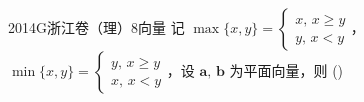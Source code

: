 
\begin{problem}{2014}{G}{浙江卷（理）}{8}{向量}
记 $ \max\{x,y\}=\begin{cases}x,\,x\geqslant y\\y,\,x<y\end{cases} $，$ \min\{x,y\}=\begin{cases}y,\,x\geqslant y\\x,\,x<y\end{cases} $，设 $ \boldsymbol{a},\,\boldsymbol{b} $ 为平面向量，则 (\hspace{1cm})
\begin{choices}
\end{choices}
\end{problem}

\begin{answer}

\end{answer}

\begin{solutions}

\end{solutions}
